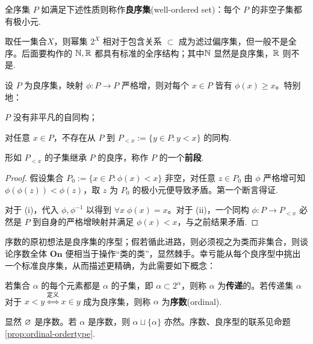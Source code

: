 \begin{definition}[Cantor]
	全序集 $P$ 如满足下述性质则称作\textbf{良序集}(well-ordered set)：每个 $P$ 的非空子集都有极小元.
\end{definition}

\begin{example}
	取任一集合$X$，则幂集 $2^X$ 相对于包含关系 $\subset$ 成为滤过偏序集，但一般不是全序。后面要构作的 $\mathbb{N},\mathbb{R}$ 都具有标准的全序结构；其中$\mathbb{N}$ 显然是良序集，$\mathbb{R}$ 则不是.
\end{example}

\begin{lemma}\label{prop:wellorder-automorphism}
	设 $P$ 为良序集，映射 $\phi: P \to P$ 严格增，则对每个 $x \in P$ 皆有 $\phi(x) \geqslant x$。特别地：
	\begin{inparaenum}[(i)]
		\item $P$ 没有非平凡的自同构；
		\item 对任意 $x \in P$，不存在从 $P$ 到 $P_{< x} := \{y \in P : y < x \}$ 的同构.
	\end{inparaenum}
\end{lemma}
形如 $P_{< x}$ 的子集继承 $P$ 的良序，称作 $P$ 的一个\textbf{前段}.
\begin{proof}
	假设集合 $P_0 := \{x \in P : \phi(x) < x \}$ 非空，对任意 $z \in P_0$ 由 $\phi$ 严格增可知 $\phi(\phi(z)) < \phi(z)$，取 $z$ 为 $P_0$ 的极小元便导致矛盾。第一个断言得证.

	对于 (i)，代入 $\phi, \phi^{-1}$ 以得到 $\forall x \; \phi(x)=x$。对于 (ii)，一个同构 $\phi: P \to P_{< x}$ 必然是 $P$ 到自身的严格增映射并满足 $\phi(x) < x$，与之前结果矛盾.
\end{proof}

序数的原初想法是良序集的序型；假若循此进路，则必须视之为类而非集合，则谈论序数全体 $\mathbf{On}$ 便相当于操作“类的类”，显然棘手。幸亏能从每个良序型中挑出一个标准良序集，从而描述更精确，为此需要如下概念：
\begin{definition}\label{def:ordinal}
	若集合 $\alpha$ 的每个元素都是 $\alpha$ 的子集，即 $\alpha \subset 2^\alpha$，则称 $\alpha$ 为\textbf{传递}的。若传递集 $\alpha$ 对于 $x < y \stackrel{\text{定义}}{\iff} x \in y$ 成为良序集，则称 $\alpha$ 为\textbf{序数}(ordinal).
\end{definition}

显然 $\varnothing$ 是序数。若 $\alpha$ 是序数，则 $\alpha \sqcup \{\alpha\}$ 亦然。序数、良序型的联系见命题 \ref{prop:ordinal-ordertype}.

